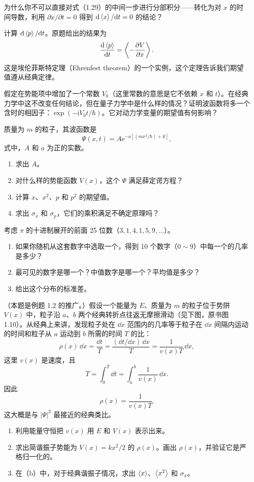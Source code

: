 为什么你不可以直接对式（1.29）的中间一步进行分部积分——转化为对 $x$ 的时间导数，利用 $\partial x/\partial t=0$ 得到 $\mathrm{d}\left\langle x\right\rangle/\mathrm{d} t=0$ 的结论？
\vfill

计算 $\mathrm{d}\left\langle p\right\rangle/\mathrm{d} t$。原题给出的结果为
\[
\frac{\mathrm{d}\left\langle p\right\rangle}{\mathrm{d} t}=\left\langle -\frac{\partial V}{\partial x}\right\rangle.
\]
这是埃伦菲斯特定理（Ehrenfest theorem）的一个实例，这个定理告诉我们期望值遵从经典定律。
\vfill

假定在势能项中增加了一个常数 $V_0$（这里常数的意思是它不依赖 $x$ 和 $t$）。在经典力学中这不改变任何结论，但在量子力学中是什么样的情况？证明波函数将多一个含时的相因子：$\exp(-\mathrm{i}V_0t/\hbar)$。它对动力学变量的期望值有何影响？
\vfill

质量为 $m$ 的粒子，其波函数是
\[
\Psi(x,t)=A\mathrm{e}^{-a\left[(mx^2/\hbar)+\mathrm{i}t\right]},
\]
式中，$A$ 和 $a$ 为正的实数。
\begin{enumerate}
\item 求出 $A$。
\item 对什么样的势能函数 $V(x)$，这个 $\Psi$ 满足薛定谔方程？
\item 计算 $x$、$x^2$、$p$ 和 $p^2$ 的期望值。
\item 求出 $\sigma_x$ 和 $\sigma_p$，它们的乘积满足不确定原理吗？
\end{enumerate}
\vfill

考虑 $\pi$ 的十进制展开的前面 25 位数（$3,1,4,1,5,9,\ldots$）。
\begin{enumerate}
\item 如果你随机从这套数字中选取一个，得到 10 个数字（$0\sim9$）中每一个的几率是多少？
\item 最可见的数字是哪一个？中值数字是哪一个？平均值是多少？
\item 给出这个分布的标准差。
\end{enumerate}
\vfill

（本题是例题 1.2 的推广。）假设一个能量为 $E$、质量为 $m$ 的粒子位于势阱 $V(x)$ 中，粒子沿 $a$、$b$ 两个经典转折点往返无摩擦滑动（见下图，原书图 1.10）。从经典上来讲，发现粒子处在 $\dd x$ 范围内的几率等于粒子在 $\dd x$ 间隔内运动的时间和粒子从 $a$ 运动到 $b$ 所需的时间 $T$ 的比：
\[
\rho(x)\,\dd x=\frac{\dd t}{T}
=\frac{(\dd t/\dd x)\,\dd x}{T}
=\frac{1}{v(x)T}\,\dd x,
\]
这里 $v(x)$ 是速度，且
\[
T=\int_0^T\dd t=\int_a^b\frac{1}{v(x)}\,\dd x.
\]
因此
\[
\rho(x)=\frac{1}{v(x)T}.
\]
这大概是与 $|\Psi|^2$ 最接近的经典类比。
\begin{enumerate}
\item 利用能量守恒把 $v(x)$ 用 $E$ 和 $V(x)$ 表示出来。
\item 求出简谐振子势能为 $V(x)=kx^2/2$ 的 $\rho(x)$。画出 $\rho(x)$，并验证它是严格归一化的。
\item 在（b）中，对于经典谐振子情况，求出 $\left\langle x\right\rangle$、$\left\langle x^2\right\rangle$ 和 $\sigma_x$。
\end{enumerate}
\begin{center}

\par{}
\end{center}
\vfill

